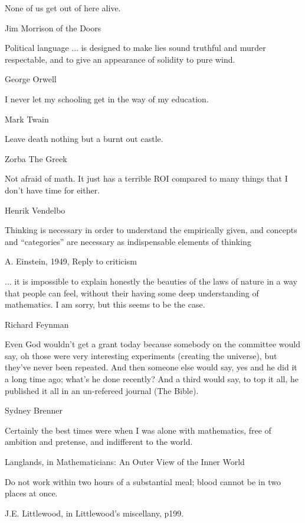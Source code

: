 \epigraph{None of us get out of here alive.}{Jim Morrison of the Doors}
\epigraph{Political language ... is designed to make lies sound truthful and murder respectable, and to give an appearance of solidity to pure wind.}{George Orwell}
\epigraph{I never let my schooling get in the way of my education.}{Mark Twain}
\epigraph{Leave death nothing but a burnt out castle.}{Zorba The Greek}
\epigraph{Not afraid of math. It just has a terrible ROI compared to many things that I don't have time for either.}{Henrik Vendelbo}
\epigraph{Thinking is necessary in order to understand the empirically given, and concepts and “categories” are necessary as indispensable elements of thinking}{A. Einstein, 1949, Reply to criticism}
\epigraph{... it is impossible to explain honestly the beauties of the laws of nature in a way that people can feel, without their having some deep understanding of mathematics. I am sorry, but this seems to be the case.}{Richard Feynman}
\epigraph{Even God wouldn't get a grant today because somebody on the committee would say, oh those were very interesting experiments (creating the universe), but they've never been repeated. And then someone else would say, yes and he did it a long time ago; what's he done recently? And a third would say, to top it all, he published it all in an un-refereed journal (The Bible).}{Sydney Brenner}
\epigraph{Certainly the best times were when I was alone with mathematics, free of ambition and pretense, and indifferent to the world.}{Langlands, in Mathematicians: An Outer View of the Inner World}      
\epigraph{Do not work within two hours of a substantial meal; blood cannot be in two places at once.}{J.E. Littlewood, in Littlewood's miscellany, p199.}
                